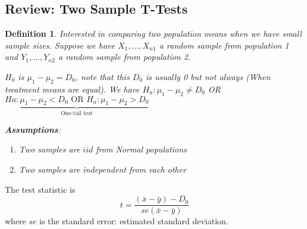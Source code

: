 \documentclass[a4paper,11pt]{article}
\newtheorem{defn}[thm]{Definition}
\begin{document}
\subsection{Review: Two Sample T-Tests}
\begin{defn}
\normalfont
Interested in comparing two population means when we have small sample sizes. Suppose we have $X_1,...,X_{n1}$ a random sample from population 1 and $Y_1,...,Y_{n2}$ a random sample from population 2. 

$H_0$ is $\mu_1-\mu_2=D_0$, note that this $D_0$ is usually 0 but not always (When treatment means are equal). We have $H_a:\mu_1-\mu_2\neq D_0$ OR $\underbrace{Ha: \mu_1-\mu_2<D_0 \text{ OR } H_a:\mu_1-\mu_2>D_0}_\text{One-tail test}$

\textbf{Assumptions}: 
\begin{enumerate}
\item Two samples are $iid$ from Normal populations
\item Two samples are independent from each other
\end{enumerate}
\end{defn}
The test statistic is
$$t=\frac{(\bar{x}-\bar{y})-D_0}{se(\bar{x}-\bar{y})}$$
where $se$ is the standard error: estimated standard deviation. 
\end{document}
